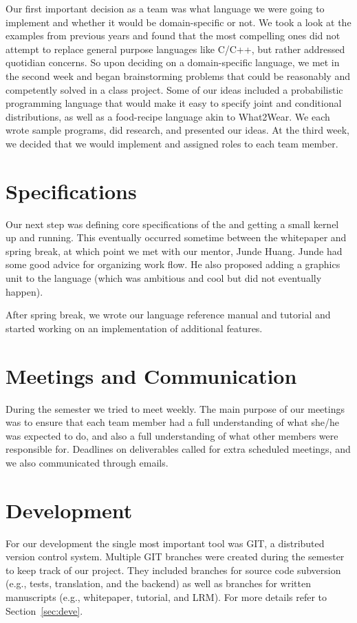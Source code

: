 Our first important decision as a team was what language we were going to
implement and whether it would be domain-specific or not. We took a look at
the examples from previous years and found that the most compelling ones did
not attempt to replace general purpose languages like C/C++, but rather
addressed quotidian concerns. So upon deciding on a domain-specific language,
we met in the second week and began brainstorming problems that could be
reasonably and competently solved in a class project. Some of our ideas
included a probabilistic programming language that would make it easy to
specify joint and conditional distributions, as well as a food-recipe language
akin to What2Wear. We each wrote sample programs, did research, and presented
our ideas. At the third week, we decided that we would implement \lang{} and
assigned roles to each team member.

\section{Specifications}
Our next step was defining core specifications of the \lang{} and getting a
small kernel up and running. This eventually occurred sometime between the
whitepaper and spring break, at which point we met with our mentor, Junde
Huang. Junde had some good advice for organizing work flow. He also proposed
adding a graphics unit to the language (which was ambitious and cool but did
not eventually happen).

After spring break, we wrote our language reference manual and tutorial and
started working on an implementation of additional features.

\section{Meetings and Communication}
During the semester we tried to meet weekly. The main purpose of our meetings
was to ensure that each team member had a full understanding of what she/he was
expected to do, and also a full understanding of what other members were
responsible for. Deadlines on deliverables called for extra scheduled meetings,
and we also communicated through emails.

\section{Development}
For our development the single most important tool was GIT, a distributed
version control system. Multiple GIT branches were created during the semester
to keep track of our project. They included branches for source code
subversion (e.g., tests, translation, and the \lang{} backend) as well as
branches for written manuscripts (e.g., whitepaper, tutorial,  and LRM).
For more details refer to Section~\ref{sec:deve}.

